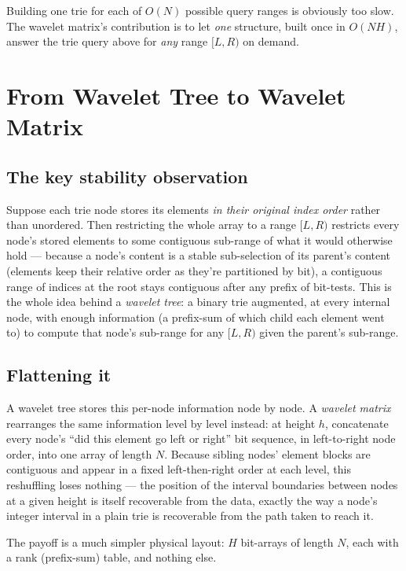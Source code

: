 \documentclass[11pt]{article}
\begin{document}
Building one trie for each of $O(N)$ possible query ranges is obviously too
slow. The wavelet matrix's contribution is to let \emph{one} structure,
built once in $O(NH)$, answer the trie query above for \emph{any} range
$[L, R)$ on demand.

\section{From Wavelet Tree to Wavelet Matrix}

\subsection{The key stability observation}
Suppose each trie node stores its elements \emph{in their original index
order} rather than unordered. Then restricting the whole array to a range
$[L, R)$ restricts every node's stored elements to some contiguous
sub-range of what it would otherwise hold --- because a node's content is a
stable sub-selection of its parent's content (elements keep their relative
order as they're partitioned by bit), a contiguous range of indices at the
root stays contiguous after any prefix of bit-tests. This is the whole idea
behind a \emph{wavelet tree}: a binary trie augmented, at every internal
node, with enough information (a prefix-sum of which child each element
went to) to compute that node's sub-range for any $[L, R)$ given the
parent's sub-range.

\subsection{Flattening it}
A wavelet tree stores this per-node information node by node. A
\emph{wavelet matrix} rearranges the same information level by level
instead: at height $h$, concatenate every node's ``did this element go
left or right'' bit sequence, in left-to-right node order, into one array
of length $N$. Because sibling nodes' element blocks are contiguous and
appear in a fixed left-then-right order at each level, this reshuffling
loses nothing --- the position of the interval boundaries between nodes at
a given height is itself recoverable from the data, exactly the way a node's
integer interval in a plain trie is recoverable from the path taken to
reach it.

The payoff is a much simpler physical layout: $H$ bit-arrays of length $N$,
each with a rank (prefix-sum) table, and nothing else.
\end{document}
